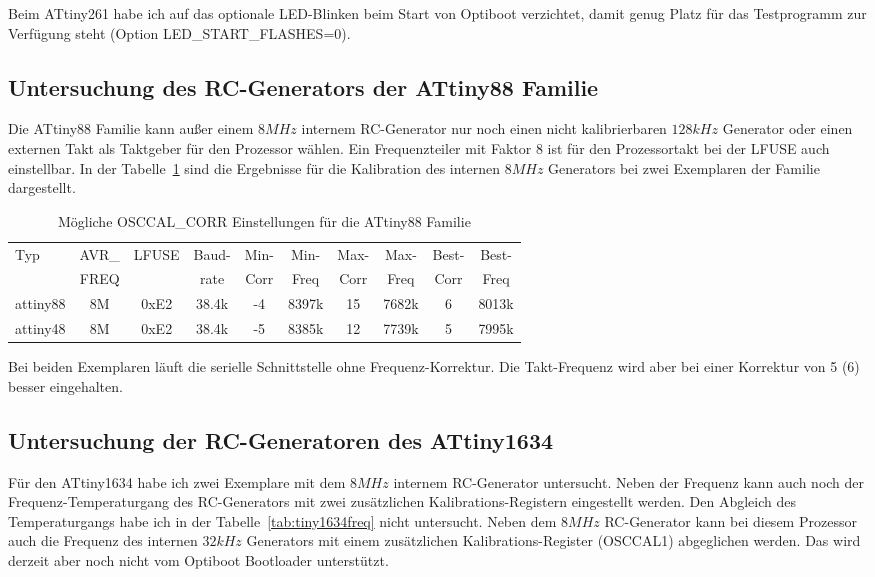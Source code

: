 Beim ATtiny261 habe ich auf das optionale LED-Blinken beim Start von Optiboot verzichtet,
damit genug Platz für das Testprogramm zur Verfügung steht (Option LED\_START\_FLASHES=0).


\subsection{Untersuchung des RC-Generators der ATtiny88 Familie}

Die ATtiny88 Familie kann außer einem \(8MHz\) internem RC-Generator nur noch einen
nicht kalibrierbaren \(128kHz\) Generator oder einen externen Takt als Taktgeber für
den Prozessor wählen. Ein Frequenzteiler mit Faktor 8 ist für den Prozessortakt
bei der LFUSE auch einstellbar. In der Tabelle~\ref{tab:tiny88freq} sind die Ergebnisse
für die Kalibration des internen \(8MHz\) Generators bei zwei Exemplaren der Familie dargestellt. 

\begin{table}[H]
  \begin{center}
    \begin{tabular}{| l | c | c | c || c | c || c | c || c | c |}
    \hline
   Typ  &       AVR\_ & LFUSE & Baud- & Min- & Min- & Max- & Max- & Best- & Best-  \\
        &       FREQ  &       & rate & Corr & Freq & Corr & Freq  & Corr  & Freq  \\
    \hline
    \hline
attiny88 &          8M & 0xE2  & 38.4k &  -4  & 8397k & 15  & 7682k  & 6  & 8013k \\
    \hline
attiny48 &         8M & 0xE2  & 38.4k &  -5  & 8385k & 12  & 7739k  & 5  & 7995k \\
    \hline
    \end{tabular}
  \end{center}
  \caption{Mögliche OSCCAL\_CORR Einstellungen für die ATtiny88 Familie}
  \label{tab:tiny88freq}
\end{table}

Bei beiden Exemplaren läuft die serielle Schnittstelle ohne Frequenz-Korrektur. 
Die Takt-Frequenz wird aber bei einer Korrektur von 5 (6) besser eingehalten.

\subsection{Untersuchung der RC-Generatoren des ATtiny1634}

Für den ATtiny1634 habe ich zwei Exemplare mit dem \(8MHz\) internem RC-Generator
untersucht. Neben der Frequenz kann auch noch der Frequenz-Temperaturgang des
RC-Generators mit zwei zusätzlichen Kalibrations-Registern eingestellt werden.
Den Abgleich des Temperaturgangs habe ich in der Tabelle~\ref{tab:tiny1634freq}
nicht untersucht. Neben dem \(8MHz\) RC-Generator kann bei diesem Prozessor
auch die Frequenz des internen \(32kHz\) Generators mit einem zusätzlichen
Kalibrations-Register (OSCCAL1) abgeglichen werden. Das wird derzeit aber noch
nicht vom Optiboot Bootloader unterstützt.

